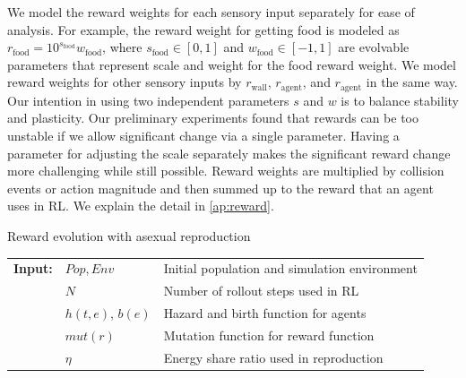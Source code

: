 We model the reward weights for each sensory input separately for ease of analysis. For example, the reward weight for getting food is modeled as $r_{\mathrm{food}} = 10^{s_{\mathrm{food}}} w_{\mathrm{food}}$, where $s_{\mathrm{food}} \in [0, 1]$ and $w_{\mathrm{food}} \in [-1, 1]$ are evolvable parameters that represent scale and weight for the food reward weight. We model reward weights for other sensory inputs by $r_\mathrm{wall}$, $r_\mathrm{agent}$, and $r_\mathrm{agent}$ in the same way. Our intention in using two independent parameters $s$ and $w$ is to balance stability and plasticity. Our preliminary experiments found that rewards can be too unstable if we allow significant change via a single parameter. Having a parameter for adjusting the scale separately makes the significant reward change more challenging while still possible. Reward weights are multiplied by collision events or action magnitude and then summed up to the reward that an agent uses in RL. We explain the detail in \cref{ap:reward}.

\begin{algorithm}
  \caption{Reward evolution with asexual reproduction}\label{alg:reward-evo}
  \begin{tabular}{lll}
    \textbf{Input:} & $Pop, Env$ & Initial population and simulation environment\\
                    & $N$ & Number of rollout steps used in RL \\
                    & $h(t, e)$, $b(e)$ & Hazard and birth function for agents \\
                    & $mut(r)$ & Mutation function for reward function \\
                    & $\eta$ & Energy share ratio used in reproduction
  \end{tabular}
  \begin{algorithmic}[1]
    \Loop{}
      \EndOnce{}
    \EndFor{}

      \EndWith{}
      \EndWith{}
    \EndFor{}
  \EndLoop{}
\end{algorithmic}
\end{algorithm}

